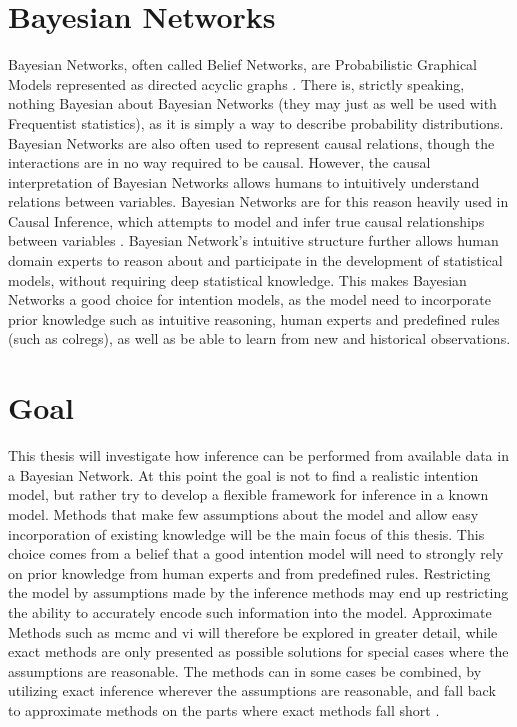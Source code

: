 \section{Bayesian Networks}
Bayesian Networks, often called Belief Networks, are Probabilistic Graphical Models represented as directed acyclic graphs \cite{murphy}. There is, strictly speaking, nothing Bayesian about Bayesian Networks (they may just as well be used with Frequentist statistics), as it is simply a way to describe probability distributions. Bayesian Networks are also often used to represent causal relations, though the interactions are in no way required to be causal. However, the causal interpretation of Bayesian Networks allows humans to intuitively understand relations between variables. Bayesian Networks are for this reason heavily used in Causal Inference, which attempts to model and infer true causal relationships between variables \cite{causal}. Bayesian Network's intuitive structure further allows human domain experts to reason about and participate in the development of statistical models, without requiring deep statistical knowledge. 
This makes Bayesian Networks a good choice for intention models, as the model need to incorporate prior knowledge such as intuitive reasoning, human experts and predefined rules (such as \Gls{colregs}), as well as be able to learn from new and historical observations. 

\section{Goal}
This thesis will investigate how inference can be performed from available data in a Bayesian Network. At this point the goal is not to find a realistic intention model, but rather try to develop a flexible framework for inference in a known model. Methods that make few assumptions about the model and allow easy incorporation of existing knowledge will be the main focus of this thesis. This choice comes from a belief that a good intention model will need to strongly rely on prior knowledge from human experts and from predefined rules. Restricting the model by assumptions made by the inference methods may end up restricting the ability to accurately encode such information into the model. Approximate Methods such as \acrfull{mcmc} and \acrfull{vi} will therefore be explored in greater detail, while exact methods are only presented as possible solutions for special cases where the assumptions are reasonable. The methods can in some cases be combined, by utilizing exact inference wherever the assumptions are reasonable, and fall back to approximate methods on the parts where exact methods fall short \cite{winnbishop}.


